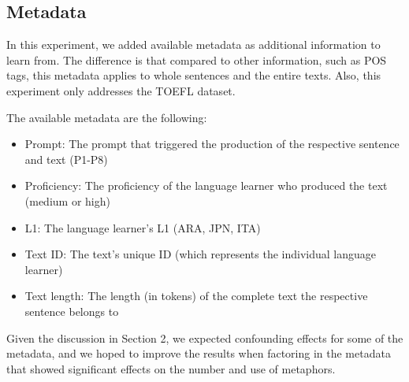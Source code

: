 \documentclass[11pt,a4paper]{article}
\begin{document}


%

\subsection{Metadata}
In this experiment, we added available metadata as additional information to learn from. The difference is that compared to other information, such as POS tags, this metadata applies to whole sentences and the entire texts. Also, this experiment only addresses the TOEFL dataset. 

The available metadata are the following:
\begin{itemize}
\item Prompt: The prompt that triggered the production of the respective sentence and text (P1-P8)
\item Proficiency: The proficiency of the language learner who produced the text (medium or high)
\item L1: The language learner's L1 (ARA, JPN, ITA)
\item Text ID: The text's unique ID (which represents the individual language learner)
\item Text length: The length (in tokens) of the complete text the respective sentence belongs to
\end{itemize}

Given the discussion in Section 2, we expected confounding effects for some of the metadata, and we hoped to improve the results when factoring in the metadata that showed significant effects on the number and use of metaphors.
\end{document}
